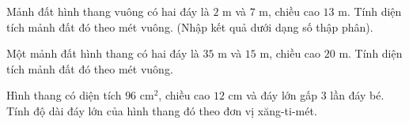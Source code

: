 \begin{ex} %
Mảnh đất hình thang vuông có hai đáy là $2\text{ m}$ và $7\text{ m}$, chiều cao $13\text{ m}$. Tính diện tích mảnh đất đó theo mét vuông. (Nhập kết quả dưới dạng số thập phân).
\end{ex}

\begin{ex} %
Một mảnh đất hình thang có hai đáy là $35\text{ m}$ và $15\text{ m}$, chiều cao $20\text{ m}$. Tính diện tích mảnh đất đó theo mét vuông.
\end{ex}

\begin{ex} %
Hình thang có diện tích $96\text{ cm}^2$, chiều cao $12\text{ cm}$ và đáy lớn gấp $3$ lần đáy bé. Tính độ dài đáy lớn của hình thang đó theo đơn vị xăng-ti-mét.
\end{ex}
